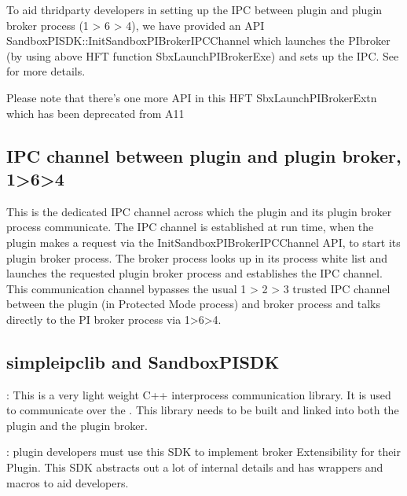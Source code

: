 \documentclass[letterpaper,12pt,english,openany,oneside]{sphinxmanual}
\begin{document}
To aid thrid\sphinxhyphen{}party developers in setting up the IPC between plugin and plugin broker process (1 \sphinxhyphen{}> 6 \sphinxhyphen{}> 4), we have provided an API SandboxPISDK::InitSandboxPIBrokerIPCChannel which launches the PI\sphinxhyphen{}broker (by using above HFT function SbxLaunchPIBrokerExe) and sets up the IPC. See  for more details.

Please note that there’s one more API in this HFT \sphinxhyphen{} SbxLaunchPIBrokerExtn which has been deprecated from A11


\subsection{IPC channel between plugin and plugin broker, 1\sphinxhyphen{}>6\sphinxhyphen{}>4}
\label{\detokenize{SandboxBrokerExt:ipc-channel-between-plugin-and-plugin-broker-1-6-4}}
This is the dedicated IPC channel across which the plug\sphinxhyphen{}in and its plug\sphinxhyphen{}in broker process communicate. The IPC channel is established at run time, when the plugin makes a request via the InitSandboxPIBrokerIPCChannel API, to start its plugin broker process. The broker process looks up in its process white list and launches the requested plugin broker process and establishes the IPC channel. This communication channel bypasses the usual 1 \sphinxhyphen{}> 2 \sphinxhyphen{}> 3 trusted IPC channel between the plugin (in Protected Mode process) and broker process and talks directly to the PI broker process via 1\sphinxhyphen{}>6\sphinxhyphen{}>4.


\subsection{simple\sphinxhyphen{}ipc\sphinxhyphen{}lib and SandboxPISDK}
\label{\detokenize{SandboxBrokerExt:simple-ipc-lib-and-sandboxpisdk}}
 : This is a very light weight C++ inter\sphinxhyphen{}process communication library. It is used to communicate over the  . This library needs to be built and linked into both the plugin and the plugin broker.

 : plugin developers must use this SDK to implement broker Extensibility for their Plugin. This SDK abstracts out a lot of internal details and has wrappers and macros to aid developers.
\end{document}

